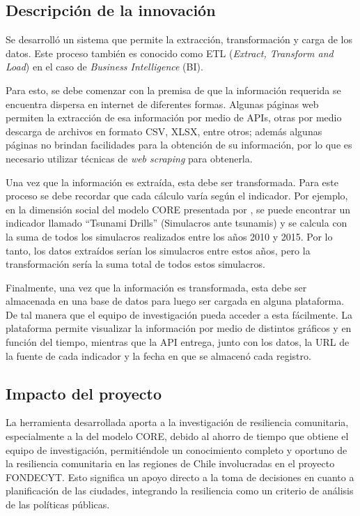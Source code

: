 \documentclass[12pt,letterpaper,oneside]{report}
\begin{document}
\subsection{Descripci\'on de la innovaci\'on}
\label{sec:innovacion}

Se desarroll\'o un sistema que permite la extracci\'on, transformaci\'on y carga de los datos. Este proceso tambi\'en es conocido como ETL (\textit{Extract, Transform and Load}) en el caso de \textit{Business Intelligence} (BI).

Para esto, se debe comenzar con la premisa de que la informaci\'on requerida se encuentra dispersa en internet de diferentes formas. Algunas p\'aginas web permiten la extracci\'on de esa informaci\'on por medio de APIs, otras por medio descarga de archivos en formato CSV, XLSX, entre otros; adem\'as algunas p\'aginas no brindan facilidades para la obtenci\'on de su informaci\'on, por lo que es necesario utilizar t\'ecnicas de \textit{web scraping} para obtenerla.

Una vez que la informaci\'on es extra\'ida, esta debe ser transformada. Para este proceso se debe recordar que cada c\'alculo var\'ia seg\'un el indicador. Por ejemplo, en la dimensi\'on social del modelo CORE presentada por \textcite{villagra2017}, se puede encontrar un indicador llamado ``Tsunami Drills'' (Simulacros ante tsunamis) y se calcula con la suma de todos los simulacros realizados entre los a\~nos 2010 y 2015. Por lo tanto, los datos extra\'idos ser\'ian los simulacros entre estos a\~nos, pero la transformaci\'on ser\'ia la suma total de todos estos simulacros.

Finalmente, una vez que la informaci\'on es transformada, esta debe ser almacenada en una base de datos para luego ser cargada en alguna plataforma. De tal manera que el equipo de investigaci\'on pueda acceder a esta f\'acilmente. La plataforma permite visualizar la informaci\'on por medio de distintos gr\'aficos y en funci\'on del tiempo, mientras que la API entrega, junto con los datos, la URL de la fuente de cada indicador y la fecha en que se almacen\'o cada registro.

\subsection{Impacto del proyecto}
\label{sec:impacto}

La herramienta desarrollada aporta a la investigaci\'on de resiliencia comunitaria, especialmente a la del modelo CORE, debido al ahorro de tiempo que obtiene el equipo de investigaci\'on, permiti\'endole un conocimiento completo y oportuno de la resiliencia comunitaria en las regiones de Chile involucradas en el proyecto FONDECYT. Esto significa un apoyo directo a la toma de decisiones en cuanto a planificaci\'on de las ciudades, integrando la resiliencia como un criterio de an\'alisis de las pol\'iticas p\'ublicas.
\end{document}
